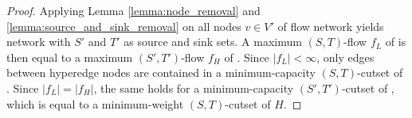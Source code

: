 \begin{proof}

Applying Lemma \ref{lemma:node_removal} and \ref{lemma:source_and_sink_removal}
on all nodes $v \in V'$ of flow network  yields network
 with $S'$ and $T'$ as source and sink sets. A maximum
$(S,T)$-flow $f_L$ of  is then equal to a maximum $(S',T')$-flow $f_H$
of . Since $|f_L| < \infty$, only edges between hyperedge 
nodes are contained in a minimum-capacity $(S,T)$-cutset of . Since $|f_L| = |f_H|$, the same
holds for a minimum-capacity $(S',T')$-cutset of , which is
equal to a minimum-weight $(S,T)$-cutset of $H$.

%

\end{proof}
